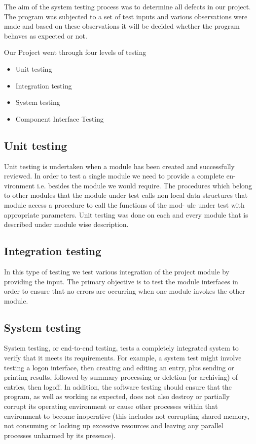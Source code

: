 \documentclass{article}
\begin{document}
The aim of the system testing process was to determine all defects in our project. The program was subjected to a set of test inputs and various observations were made and based on these observations it will be decided whether the program behaves as expected or not.

Our Project went through four levels of testing
\begin{itemize}
\item Unit testing
\item Integration testing
\item System testing
\item Component Interface Testing
\end{itemize}

\subsection{Unit testing}
Unit testing is undertaken when a module has been created and successfully reviewed. In order to test a single module we need to provide a complete en- vironment i.e. besides the module we would require. The procedures which belong to other modules that the module under test calls non local data structures that module access a procedure to call the functions of the mod- ule under test with appropriate parameters. Unit testing was done on each and every module that is described under module wise description.

\subsection{Integration testing}
In this type of testing we test various integration of the project module by providing the input. The primary objective is to test the module interfaces in order to ensure that no errors are occurring when one module invokes the other module.

\subsection{System testing}
System testing, or end-to-end testing, tests a completely integrated system to verify that it meets its requirements. For example, a system test might involve testing a logon interface, then creating and editing an entry, plus sending or printing results, followed by summary processing or deletion (or archiving) of entries, then logoff.
In addition, the software testing should ensure that the program, as well as working as expected, does not also destroy or partially corrupt its operating environment or cause other processes within that environment to become inoperative (this includes not corrupting shared memory, not consuming or locking up excessive resources and leaving any parallel processes unharmed by its presence).
\end{document}
